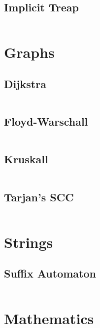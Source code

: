 \documentclass[8pt,a4paper,landscape,oneside]{amsart}
\begin{document}
\begin{multicols*}{2}
\begin{multicols*}{2}
		\subsection{Implicit Treap}
		\inputminted[firstline=16,lastline=57]{c++}{_code/datastructures/implicit_treap.cpp}
		\vfill\null
		\columnbreak
		\vfill\null
	\end{multicols*}
	\section{Graphs}
	\begin{multicols*}{2}
		\subsection{Dijkstra}
		\inputminted[firstline=21,lastline=32]{c++}{_code/graphs/dijkstra.cpp}
		\subsection{Floyd-Warschall}
		\inputminted[firstline=17,lastline=21]{c++}{_code/graphs/floyd_warschall.cpp}
		\subsection{Kruskall}
		\inputminted[firstline=27,lastline=37]{c++}{_code/graphs/kruskall.cpp}
		\vfill\null
		\columnbreak
		\subsection{Tarjan's SCC}
		\inputminted[firstline=27,lastline=39]{c++}{_code/graphs/scc.cpp}
		\vfill\null
	\end{multicols*}
	\vfill\null
	\newpage
	\section{Strings}
	\begin{multicols*}{2}
		\subsection{Suffix Automaton}
		\inputminted[firstline=15,lastline=67]{c++}{_code/strings/suffixAutomaton.cpp}
		\vfill\null
		\columnbreak
		\vfill\null
	\end{multicols*}
	\section{Mathematics}
	\begin{multicols*}{2}

\end{multicols*}
\end{multicols*}
\end{document}

